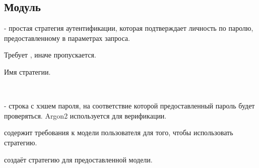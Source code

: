 \subsection{Модуль }\label{page-FPauth-strategies-module-FPauth+u+strategies-module-Password}%
 - простая стратегия аутентификации, которая подтверждает личность по паролю, предоставленному в параметрах запроса.

Требует , иначе пропускается.

\label{page-FPauth-strategies-module-FPauth+u+strategies-module-Password-val-name}\begin{ocamlindent}Имя стратегии.\end{ocamlindent}%
\medbreak
\label{page-FPauth-strategies-module-FPauth+u+strategies-module-Password-module-type-MODEL}\begin{ocamlindent}\label{page-FPauth-strategies-module-FPauth+u+strategies-module-Password-module-type-MODEL-type-t}\\
\label{page-FPauth-strategies-module-FPauth+u+strategies-module-Password-module-type-MODEL-val-encrypted+u+password}\begin{ocamlindent} - строка с хэшем пароля, на соответствие которой предоставленный пароль будет проверяться. Argon2 используется для верификации.\end{ocamlindent}%
\medbreak
\end{ocamlindent}%
\begin{ocamlindent} содержит требования к модели пользователя для того, чтобы использовать стратегию.\end{ocamlindent}%
\medbreak
\label{page-FPauth-strategies-module-FPauth+u+strategies-module-Password-module-Make}\begin{ocamlindent} создаёт стратегию для предоставленной модели.\end{ocamlindent}%
\medbreak

% 
